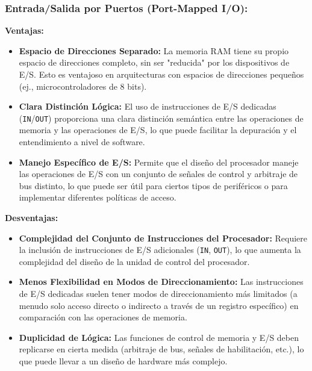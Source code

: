 \documentclass[12pt, a4paper]{article}
\begin{document}
\subsubsection*{Entrada/Salida por Puertos (Port-Mapped I/O):}
\textbf{Ventajas:}
\begin{itemize}
    \item \textbf{Espacio de Direcciones Separado:} La memoria RAM tiene su propio espacio de direcciones completo, sin ser "reducida" por los dispositivos de E/S. Esto es ventajoso en arquitecturas con espacios de direcciones pequeños (ej., microcontroladores de 8 bits).
    \item \textbf{Clara Distinción Lógica:} El uso de instrucciones de E/S dedicadas (\texttt{IN}/\texttt{OUT}) proporciona una clara distinción semántica entre las operaciones de memoria y las operaciones de E/S, lo que puede facilitar la depuración y el entendimiento a nivel de software.
    \item \textbf{Manejo Específico de E/S:} Permite que el diseño del procesador maneje las operaciones de E/S con un conjunto de señales de control y arbitraje de bus distinto, lo que puede ser útil para ciertos tipos de periféricos o para implementar diferentes políticas de acceso.
\end{itemize}
\textbf{Desventajas:}
\begin{itemize}
    \item \textbf{Complejidad del Conjunto de Instrucciones del Procesador:} Requiere la inclusión de instrucciones de E/S adicionales (\texttt{IN}, \texttt{OUT}), lo que aumenta la complejidad del diseño de la unidad de control del procesador.
    \item \textbf{Menos Flexibilidad en Modos de Direccionamiento:} Las instrucciones de E/S dedicadas suelen tener modos de direccionamiento más limitados (a menudo solo acceso directo o indirecto a través de un registro específico) en comparación con las operaciones de memoria.
    \item \textbf{Duplicidad de Lógica:} Las funciones de control de memoria y E/S deben replicarse en cierta medida (arbitraje de bus, señales de habilitación, etc.), lo que puede llevar a un diseño de hardware más complejo.
\end{itemize}
\end{document}
